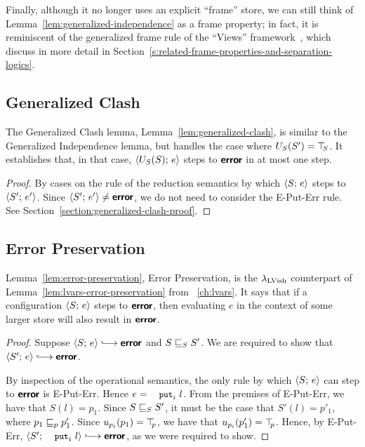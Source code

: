 Finally, although it no longer uses an explicit ``frame'' store, we
can still think of Lemma~\ref{lem:generalized-independence} as a frame
property; in fact, it is reminiscent of the generalized frame rule of
the ``Views'' framework~\cite{views}, which  discuss in more detail
in Section~\ref{s:related-frame-properties-and-separation-logics}.

\subsection{Generalized Clash}

The Generalized Clash lemma, Lemma~\ref{lem:generalized-clash}, is
similar to the Generalized Independence lemma, but handles the case
where $U_S(S') = \top\hspace{-0.85mm}_{S}$.  It establishes that, in that case,
$\langle U_S(S);\, e \rangle$ steps to $\textbf{\textsf{error}}$ in at most one step.

\LemGeneralizedClash
\ifdefined\DISSERTATION
\begin{proof}
  By cases on the rule of the reduction semantics by which
  $\langle S;\, e \rangle$ steps to $\langle S';\, e' \rangle$.  Since $\langle S';\, e' \rangle
  \neq \textbf{\textsf{error}}$, we do not need to consider the {\sc E-Put-Err} rule.
  See Section~\ref{section:generalized-clash-proof}.
\end{proof}
\fi

\subsection{Error Preservation}

Lemma~\ref{lem:error-preservation}, Error Preservation, is the
$\lambda_{\textrm{LVish}}$ counterpart of Lemma~\ref{lem:lvars-error-preservation}
from ~\ref{ch:lvars}.  It says that if a configuration
$\langle S;\, e \rangle$ steps to $\textbf{\textsf{error}}$, then evaluating $e$ in the context
of some larger store will also result in $\textbf{\textsf{error}}$.

\LemErrorPreservation
\ifdefined\DISSERTATION
\begin{proof}
  Suppose $\config{S}{e} \parstepsto \error$ and
  $S \sqsubseteq_S S'$. We are required to show that $\config{S'}{e}
  \parstepsto \error$.

  By inspection of the operational semantics, the only rule by which
  $\langle S;\, e \rangle$ can step to $\textbf{\textsf{error}}$ is {\sc E-Put-Err}.  Hence $e =
  \putiexp{l}$.  From the premises of {\sc E-Put-Err}, we have that
  $S(l) = p_1$.  Since $S \sqsubseteq_S S'$, it must be the case that
  $S'(l) = p'_1$, where $p_1 \sqsubseteq_p p'_1$.  Since $u_{p_i}(p_1) =
  \top\hspace{-0.85mm}_{p}$, we have that $u_{p_i}(p'_1) = \top\hspace{-0.85mm}_{p}$.  Hence, by {\sc
    E-Put-Err}, $\config{S'}{\putiexp{l}} \parstepsto \error$, as we
  were required to show.
\end{proof}
\fi

